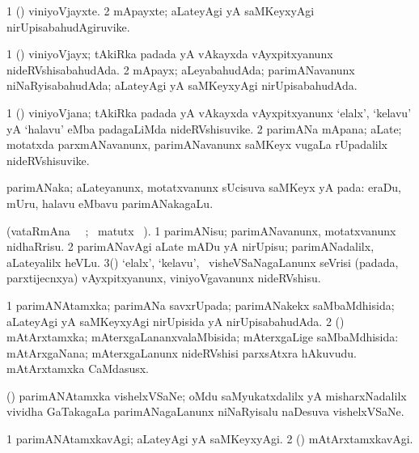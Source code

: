 \bentry
{}
\gl{\nA}
\bmng
\bnum
\num{1} (\takaR) viniyoVjayxte. 
\num{2} mApayxte; aLateyAgi yA saMKeyxyAgi nirUpisabahudAgiruvike. 
\enum
\emng
\eentry

\bentry
{}
\gl{\gu}
\bmng
\bnum
\num{1} (\takaR) viniyoVjayx; tAkiRka padada yA vAkayxda vAyxpitxyanunx nideRVshisabahudAda. 
\num{2} mApayx; aLeyabahudAda; parimANavanunx niNaRyisabahudAda; aLateyAgi yA saMKeyxyAgi nirUpisabahudAda. 
\enum
\emng
\eentry

\bentry
{}
\gl{\nA}
\bmng
\bnum
\num{1} (\takaR) viniyoVjana; tAkiRka padada yA vAkayxda vAyxpitxyanunx `elalx', `kelavu' yA `halavu' eMba padagaLiMda nideRVshisuvike. 
\num{2} parimANa mApana; aLate; motatxda parxmANavanunx, parimANavanunx saMKeyx \mo vugaLa rUpadalilx nideRVshisuvike. 
\enum
\emng
\eentry

\bentry
{}
\gl{\nA}
\bmng
parimANaka; aLateyanunx, motatxvanunx sUcisuva saMKeyx yA pada:  eraDu, mUru, halavu eMbavu parimANakagaLu. 
\emng
\eentry

\bentry
{}
\gl{\sakirx}
(vataRmAna \parxpu\ \Eva\ ; \BU\ matutx \BUkaq\ ). \bmng
\bnum
\num{1} parimANisu; parimANavanunx, motatxvanunx nidhaRrisu. 
\num{2} parimANavAgi aLate mADu yA nirUpisu; parimANadalilx, aLateyalilx heVLu. 
\num{3}(\takaR) `elalx', `kelavu', \mo\ visheVSaNagaLanunx seVrisi (padada, parxtijecnxya) vAyxpitxyanunx, viniyoVgavanunx nideRVshisu. 
\enum
\emng
\eentry

\bentry
{}
\gl{\gu}
\bmng
\bnum
\num{1} parimANAtamxka; parimANa savxrUpada; parimANakekx saMbaMdhisida; aLateyAgi yA saMKeyxyAgi nirUpisida yA nirUpisabahudAda. 
\num{2} (\CaM) mAtArxtamxka; mAterxgaLananxvalaMbisida; mAterxgaLige saMbaMdhisida:   mAtArxgaNana; mAterxgaLanunx nideRVshisi parxsAtxra hAkuvudu.  mAtArxtamxka CaMdasusx. 
\enum
\emng
\eentry

\bentry
{}
\gl{\nA}
\bmng
(\ravi) parimANAtamxka vishelxVSaNe; oMdu saMyukatxdalilx yA misharxNadalilx vividha GaTakagaLa parimANagaLanunx niNaRyisalu naDesuva vishelxVSaNe. 
\emng
\eentry

\bentry
{}
\gl{\kirxvi}
\bmng
\bnum
\num{1} parimANAtamxkavAgi; aLateyAgi yA saMKeyxyAgi. 
\num{2} (\CaM) mAtArxtamxkavAgi. 
\enum
\emng
\eentry

